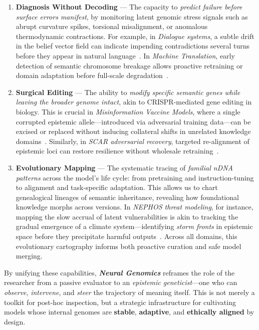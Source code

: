 \begin{enumerate}
    \item \textbf{Diagnosis Without Decoding} — The capacity to \emph{predict failure before surface errors manifest}, by monitoring latent genomic stress signals such as abrupt curvature spikes, torsional misalignment, or anomalous thermodynamic contractions. For example, in \emph{Dialogue systems}, a subtle drift in the belief vector field can indicate impending contradictions several turns before they appear in natural language~\cite{mehri2020usr, liu2023geval}. In \emph{Machine Translation}, early detection of semantic chromosome breakage allows proactive retraining or domain adaptation before full-scale degradation~\cite{marie2022scientific}.
    
    \item \textbf{Surgical Editing} — The ability to \emph{modify specific semantic genes while leaving the broader genome intact}, akin to CRISPR-mediated gene editing in biology. This is crucial in \emph{Misinformation Vaccine Models}, where a single corrupted epistemic allele—introduced via adversarial training data—can be excised or replaced without inducing collateral shifts in unrelated knowledge domains~\cite{zellers2019defending, schuster2020limitations}. Similarly, in \emph{SCAR adversarial recovery}, targeted re-alignment of epistemic loci can restore resilience without wholesale retraining~\cite{das2024scar}.
    
    \item \textbf{Evolutionary Mapping} — The systematic tracing of \emph{familial nDNA patterns} across the model’s life cycle: from pretraining and instruction-tuning to alignment and task-specific adaptation. This allows us to chart genealogical lineages of semantic inheritance, revealing how foundational knowledge morphs across versions. In \emph{NEPHOS threat modeling}, for instance, mapping the slow accrual of latent vulnerabilities is akin to tracking the gradual emergence of a climate system—identifying \emph{storm fronts} in epistemic space before they precipitate harmful outputs~\cite{das2024nephos}. Across all domains, this evolutionary cartography informs both proactive curation and safe model merging.
\end{enumerate}

By unifying these capabilities, \textbf{\emph{Neural Genomics}} reframes the role of the researcher from a passive evaluator to an \emph{epistemic geneticist}—one who can \emph{observe}, \emph{intervene}, and \emph{steer} the trajectory of meaning itself. This is not merely a toolkit for post-hoc inspection, but a strategic infrastructure for cultivating models whose internal genomes are \textbf{stable}, \textbf{adaptive}, and \textbf{ethically aligned} by design.


